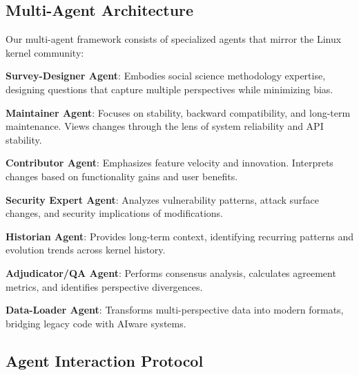 \subsection{Multi-Agent Architecture}

Our multi-agent framework consists of specialized agents that mirror the Linux kernel community:

\textbf{Survey-Designer Agent}: Embodies social science methodology expertise, designing questions that capture multiple perspectives while minimizing bias.

\textbf{Maintainer Agent}: Focuses on stability, backward compatibility, and long-term maintenance. Views changes through the lens of system reliability and API stability.

\textbf{Contributor Agent}: Emphasizes feature velocity and innovation. Interprets changes based on functionality gains and user benefits.

\textbf{Security Expert Agent}: Analyzes vulnerability patterns, attack surface changes, and security implications of modifications.

\textbf{Historian Agent}: Provides long-term context, identifying recurring patterns and evolution trends across kernel history.

\textbf{Adjudicator/QA Agent}: Performs consensus analysis, calculates agreement metrics, and identifies perspective divergences.

\textbf{Data-Loader Agent}: Transforms multi-perspective data into modern formats, bridging legacy code with AIware systems.

\subsection{Agent Interaction Protocol}

